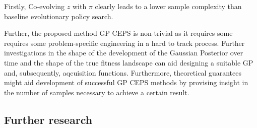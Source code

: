 Firstly, Co-evolving $z$ with $\pi$ clearly leads to a lower sample complexity than baseline evolutionary policy search. 

Further, the proposed method GP CEPS is non-trivial as it requires some requires some problem-specific engineering in a hard to track process. Further investigations in the shape of the development of the Gaussian Posterior over time and the shape of the true fitness landscape can aid designing a suitable GP and, subsequently, aqcuisition functions. Furthermore, theoretical guarantees might aid development of successful GP CEPS methods by provising insight in the number of samples necessary to achieve a certain result.



\subsection{Further research}

